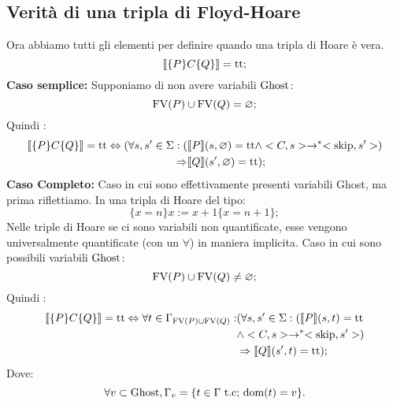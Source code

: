 \subsection{Verità di una tripla di Floyd-Hoare}
Ora abbiamo tutti gli elementi per definire quando una tripla di Hoare è vera.
\[
\llbracket \{P\}C\{Q\} \rrbracket = \mathrm{tt};
\]
\textbf{Caso semplice: }Supponiamo di non avere variabili $\mathrm{Ghost}$:
\[
\mathrm{FV}(P) \cup \mathrm{FV}(Q)= \varnothing;
\]
Quindi :
\begin{align*}
   \llbracket \{P\} C\{Q\} \rrbracket = \mathrm{tt} \Leftrightarrow (\forall s,s'\in \Sigma \mathrel{:}(
      &\llbracket P \rrbracket( s,\varnothing) = \mathrm{tt}\wedge <C,s>\rightarrow ^*<\mathrm{skip},s'>)\\
      \Rightarrow&\llbracket Q \rrbracket(s',\varnothing)=\mathrm{tt});
\end{align*}
\textbf{Caso Completo: }Caso in cui sono effettivamente presenti variabili Ghost, ma prima riflettiamo. In una tripla di Hoare del tipo:
\[
\{x=n\}x:=x+1\{x=n+1\};
\]
Nelle triple di Hoare se ci sono variabili non quantificate, esse vengono universalmente quantificate (con un $\forall$) in maniera implicita. Caso in cui sono possibili variabili $\mathrm{Ghost}$:
\[
\mathrm{FV}(P) \cup \mathrm{FV}(Q) \neq \varnothing;
\]
Quindi :
\begin{align*}
    \llbracket \{P\} C\{Q\} \rrbracket = \mathrm{tt} \Leftrightarrow \forall t \in \Gamma_{\mathrm{FV}(P)\cup \mathrm{FV}(Q)}\mathrel{:} 
       &(\forall  s,s'\in \Sigma\mathrel{:}(\llbracket P \rrbracket(s,t) = \mathrm{tt}\\
       &\wedge <C,s>\rightarrow ^*<\mathrm{skip},s'>)\\
       &\Rightarrow\llbracket Q \rrbracket(s',t)=\mathrm{tt});
\end{align*}
Dove:
\[
\forall v \subset\mathrm{Ghost},\Gamma_{v} =\{t \in \Gamma \text{ t.c; $\mathop{\mathrm{dom}}\nolimits(t) =v$\}}.
\]

